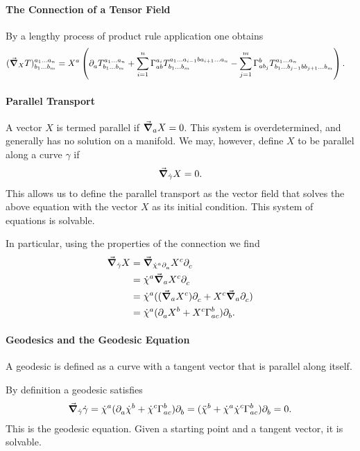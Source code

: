 \paragraph{The Connection of a Tensor Field}
By a lengthy process of product rule application one obtains
\begin{align*}
\tensor*{(\dcov{X}{T})}{^{a_{1}\dots a_{n}}_{b_{1}\dots b_{m}}} &= X^{a}\left(\del{a}{\tensor*{T}{^{a_{1}\dots a_{n}}_{b_{1}\dots b_{m}}}} + \sum\limits_{i = 1}^{n}\chris{a_{i}}{a}{b}\tensor*{T}{^{a_{1}\dots a_{i - 1}ba_{i + 1}\dots a_{n}}_{b_{1}\dots b_{m}}} - \sum\limits_{j = 1}^{m}\chris{b}{a}{b_{j}}\tensor*{T}{^{a_{1}\dots a_{n}}_{b_{1}\dots b_{j - 1}bb_{j + 1}\dots b_{m}}}\right).
\end{align*}

\paragraph{Parallel Transport}
A vector $X$ is termed parallel if $\grad_{a}{X} = 0$. This system is overdetermined, and generally has no solution on a manifold. We may, however, define $X$ to be parallel along a curve $\gamma$ if
\begin{align*}
\grad_{\dot{\gamma}}{X} = 0.
\end{align*}
This allows us to define the parallel transport as the vector field that solves the above equation with the vector $X$ as its initial condition. This system of equations is solvable.

In particular, using the properties of the connection we find
\begin{align*}
\dcov{\dot{\gamma}}{X} &= \dcov{\dot{\chi}^{a}\del{a}{}}{X^{c}\del{c}{}} \\
&= \dot{\chi}^{a}\dcov{a}{X^{c}\del{c}{}} \\
&= \dot{\chi}^{a}((\dcov{a}{X^{c}})\del{c}{} + X^{c}\dcov{a}{\del{c}{}}) \\
&= \dot{\chi}^{a}(\del{a}{X^{b}} + X^{c}\chris{b}{a}{c})\del{b}{}.
\end{align*}

\paragraph{Geodesics and the Geodesic Equation}
A geodesic is defined as a curve with a tangent vector that is parallel along itself.

By definition a geodesic satisfies
\begin{align*}
\dcov{\dot{\gamma}}{\dot{\gamma}} = \dot{\chi}^{a}(\del{a}{\dot{\chi}^{b}} + \dot{\chi}^{c}\chris{b}{a}{c})\del{b}{} = (\ddot{\chi}^{b} + \dot{\chi}^{a}\dot{\chi}^{c}\chris{b}{a}{c})\del{b}{} = 0.
\end{align*}
This is the geodesic equation. Given a starting point and a tangent vector, it is solvable.

